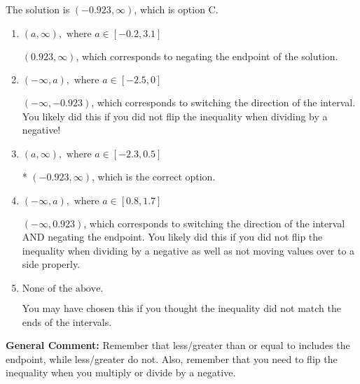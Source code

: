 \documentclass{extbook}[14pt]
\begin{document}
\begin{enumerate}
{The solution is \( (-0.923, \infty) \), which is option C.\begin{enumerate}[label=\Alph*.]
\item \( (a, \infty), \text{ where } a \in [-0.2, 3.1] \)

 $(0.923, \infty)$, which corresponds to negating the endpoint of the solution.
\item \( (-\infty, a), \text{ where } a \in [-2.5, 0] \)

 $(-\infty, -0.923)$, which corresponds to switching the direction of the interval. You likely did this if you did not flip the inequality when dividing by a negative!
\item \( (a, \infty), \text{ where } a \in [-2.3, 0.5] \)

* $(-0.923, \infty)$, which is the correct option.
\item \( (-\infty, a), \text{ where } a \in [0.8, 1.7] \)

 $(-\infty, 0.923)$, which corresponds to switching the direction of the interval AND negating the endpoint. You likely did this if you did not flip the inequality when dividing by a negative as well as not moving values over to a side properly.
\item \( \text{None of the above}. \)

You may have chosen this if you thought the inequality did not match the ends of the intervals.
\end{enumerate}

\textbf{General Comment:} Remember that less/greater than or equal to includes the endpoint, while less/greater do not. Also, remember that you need to flip the inequality when you multiply or divide by a negative.
}
\end{enumerate}
\end{document}
